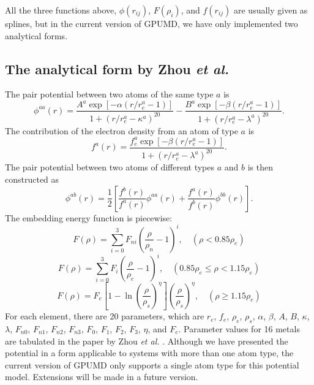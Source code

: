 \documentclass[12pt,a4paper]{report}
\begin{document}
All the three functions above, $\phi(r_{ij})$, $F(\rho_i)$, and $f(r_{ij})$ are usually given as splines, but in the current version of GPUMD, we have only implemented two analytical forms.

\subsection{The analytical form by Zhou \textit{et al.}}

The pair potential between two atoms of the same type $a$ is
\begin{equation}
\phi^{aa}(r) = \frac{ A^a \exp[-\alpha(r/r_e^a-1)] } { 1+(r/r_e^a-\kappa^a)^{20} } -
          \frac{ B^a \exp[-\beta(r/r_e^a-1)] } { 1+(r/r_e^a-\lambda^a)^{20} }.
\end{equation}
The contribution of the electron density from an atom of type $a$ is
\begin{equation}
f^a(r) = \frac{ f_e^a \exp[-\beta(r/r_e^a-1)] } { 1+(r/r_e^a-\lambda^a)^{20} }.
\end{equation}
The pair potential between two atoms of different types $a$ and $b$ is then
constructed as
\begin{equation}
\phi^{ab}(r) = \frac{1}{2}
\left[
\frac{ f^b(r) } { f^a(r) } \phi^{aa}(r) + \frac{ f^a(r) } { f^b(r) } \phi^{bb}(r)
\right].
\end{equation}
The embedding energy function is piecewise:
\begin{equation}
F(\rho) = \sum_{i=0}^3 F_{ni} \left( \frac{\rho}{\rho_n}-1\right)^i, \quad (\rho < 0.85\rho_e)
\end{equation}
\begin{equation}
F(\rho) = \sum_{i=0}^3 F_{i} \left( \frac{\rho}{\rho_e}-1\right)^i, \quad (0.85\rho_e \leq \rho < 1.15\rho_e)
\end{equation}
\begin{equation}
F(\rho) = F_{e} \left[ 1- \ln \left(\frac{\rho}{\rho_s}\right)^{\eta}\right] \left(\frac{\rho}{\rho_s}\right)^{\eta}, \quad (\rho \geq 1.15\rho_e)
\end{equation}
For each element, there are 20 parameters, which are $r_e$, $f_e$, $\rho_e$, $\rho_s$, $\alpha$, $\beta$, $A$, $B$, $\kappa$, $\lambda$, $F_{n0}$, $F_{n1}$, $F_{n2}$, $F_{n3}$, $F_{0}$, $F_{1}$, $F_{2}$, $F_{3}$, $\eta$, and $F_e$. Parameter values for 16 metals are tabulated in the paper by Zhou \textit{et al.} \cite{zhou2004prb}. Although we have presented the potential in a form applicable to systems with more than one atom type, the current version of GPUMD only supports a single atom type for this potential model. Extensions will be made in a future version.
\end{document}
